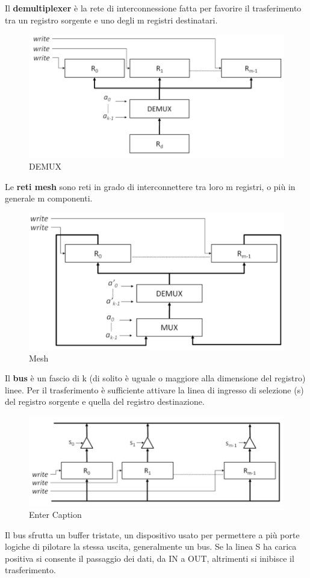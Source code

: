 \documentclass[12pt]{article} %
\begin{document}
\newpage 
\noindent Il \textbf{demultiplexer} è la rete di interconnessione fatta per favorire il trasferimento tra un registro sorgente e uno degli m registri destinatari.
\begin{figure}[h]
    \centering
    \includegraphics[width=0.5\linewidth]{demux.png}
    \caption{DEMUX}
\end{figure}
\par\medskip\noindent
Le \textbf{reti mesh} sono reti in grado di interconnettere tra loro m registri, o più in generale m componenti.
\begin{figure}[h]
    \centering
    \includegraphics[width=0.5\linewidth]{mesh.png}
    \caption{Mesh}

\end{figure}
\par\medskip\noindent
Il \textbf{bus} è un fascio di k (di solito è uguale o maggiore alla dimensione del
registro) linee. Per il trasferimento è sufficiente attivare la linea di ingresso di selezione (s)
del registro sorgente e quella del registro destinazione.\par\medskip\noindent 
\begin{figure}[h]
    \centering
    \includegraphics[width=0.5\linewidth]{bus.png}
    \caption{Enter Caption}
\end{figure}
\newpage 
\noindent Il bus sfrutta un buffer tristate, un dispositivo usato per permettere a più porte
logiche di pilotare la stessa uscita, generalmente un bus. Se la linea S ha carica positiva
si consente il passaggio dei dati, da IN a OUT, altrimenti si inibisce il trasferimento.\par\medskip\noindent
\end{document}
